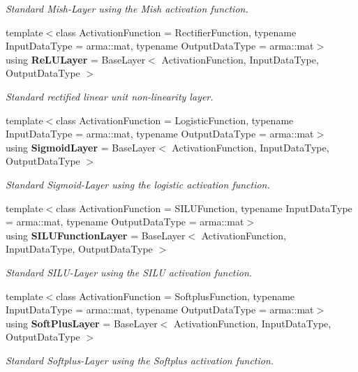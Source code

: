 \begin{DoxyCompactItemize}
\begin{DoxyCompactList}\small\item\em Standard Mish-\/\+Layer using the Mish activation function. \end{DoxyCompactList}\item 
{\footnotesize template$<$class Activation\+Function  = Rectifier\+Function, typename Input\+Data\+Type  = arma\+::mat, typename Output\+Data\+Type  = arma\+::mat$>$ }\\using \textbf{ Re\+L\+U\+Layer} = Base\+Layer$<$ Activation\+Function, Input\+Data\+Type, Output\+Data\+Type $>$
\begin{DoxyCompactList}\small\item\em Standard rectified linear unit non-\/linearity layer. \end{DoxyCompactList}\item 
{\footnotesize template$<$class Activation\+Function  = Logistic\+Function, typename Input\+Data\+Type  = arma\+::mat, typename Output\+Data\+Type  = arma\+::mat$>$ }\\using \textbf{ Sigmoid\+Layer} = Base\+Layer$<$ Activation\+Function, Input\+Data\+Type, Output\+Data\+Type $>$
\begin{DoxyCompactList}\small\item\em Standard Sigmoid-\/\+Layer using the logistic activation function. \end{DoxyCompactList}\item 
{\footnotesize template$<$class Activation\+Function  = S\+I\+L\+U\+Function, typename Input\+Data\+Type  = arma\+::mat, typename Output\+Data\+Type  = arma\+::mat$>$ }\\using \textbf{ S\+I\+L\+U\+Function\+Layer} = Base\+Layer$<$ Activation\+Function, Input\+Data\+Type, Output\+Data\+Type $>$
\begin{DoxyCompactList}\small\item\em Standard S\+I\+L\+U-\/\+Layer using the S\+I\+LU activation function. \end{DoxyCompactList}\item 
{\footnotesize template$<$class Activation\+Function  = Softplus\+Function, typename Input\+Data\+Type  = arma\+::mat, typename Output\+Data\+Type  = arma\+::mat$>$ }\\using \textbf{ Soft\+Plus\+Layer} = Base\+Layer$<$ Activation\+Function, Input\+Data\+Type, Output\+Data\+Type $>$
\begin{DoxyCompactList}\small\item\em Standard Softplus-\/\+Layer using the Softplus activation function. \end{DoxyCompactList}\item 

\end{DoxyCompactItemize}
